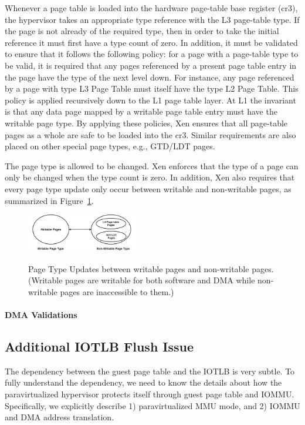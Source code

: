 Whenever a page table is loaded into the hardware page-table base register (cr3),
the hypervisor takes an appropriate type reference with the L3 page-table type.
If the page is not already of the required type, then in order to take the initial reference it must first have a type count of zero.
In addition, it must be validated to ensure that it follows the following policy:
for a page with a page-table type to be valid, it is required that any pages referenced
by a present page table entry in the page have the type of the next level down.
For instance, any page referenced by a page with type L3 Page Table must itself have the type L2 Page Table.
This policy is applied recursively down to the L1 page table layer.
At L1 the invariant is that any data page mapped by a writable page table entry must have the writable page type.
By applying these policies, Xen ensures that all page-table pages as a whole are safe to be loaded into the cr3.
Similar requirements are also placed on other special page types, e.g., GTD/LDT pages.

The page type is allowed to be changed.
Xen enforces that the type of a page can only be changed when the type count is zero.
In addition, Xen also requires that every page type update only occur between writable and non-writable pages, as summarized in Figure~\ref{fig:page-type-updates}.

\begin{figure}[ht]
\centering
\includegraphics[width=0.45\textwidth]{image/background/page-type-updates.png} \\
\caption{Page Type Updates between writable pages and non-writable pages. (Writable pages are writable for both software and DMA
while non-writable pages are inaccessible to them.)}
\label{fig:page-type-updates}
\end{figure}


\paragraph{DMA Validations}

\subsection{Additional IOTLB Flush Issue}
The dependency between the guest page table and the IOTLB is very subtle.
To fully understand the dependency, we need to know the details about how the paravirtualized hypervisor protects itself through guest page table and IOMMU.
Specifically, we explicitly describe 1) paravirtualized MMU mode, and 2) IOMMU and DMA address translation.

